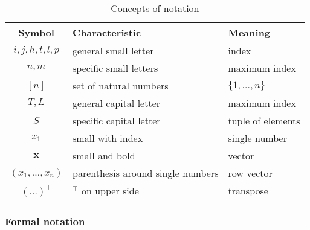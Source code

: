 \begin{table}
	\begin{tabular}{cll}
		\toprule
		Symbol & Characteristic & Meaning\\
		\midrule
		$i, j, h, t, l, p$ & general small letter & index\\
		$n, m$ & specific small letters & maximum index\\
		$[n]$ & set of natural numbers& $\{1, \dots, n\}$\\
		$T, L$ & general capital letter & maximum index\\
		$S$ & specific capital letter & tuple of elements\\
		$x_1$ & small with index & single number\\
		$\boldsymbol{x}$ & small and bold & vector\\
		$(x_1, \dots, x_n)$ & parenthesis around single numbers & row vector\\
		$(\dots)^\intercal$ & $^\intercal$ on upper side & transpose\\
		\bottomrule
	\end{tabular}
	\caption{Concepts of notation}\label{tb:Prob:Notation}
\end{table}

\subsubsection{Formal notation}

